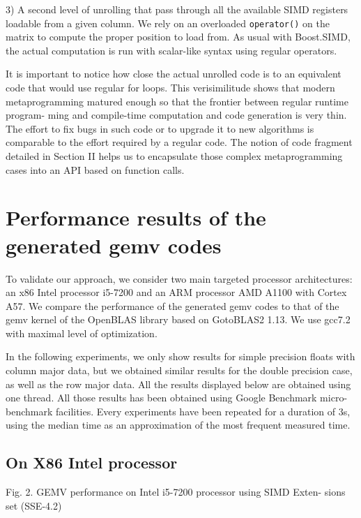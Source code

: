 \documentclass[../main]{subfiles}
\begin{document}
3) A second level of unrolling that pass through all the
available SIMD registers loadable from a given column.
We rely on an overloaded \lstinline{operator()} on the matrix
to compute the proper position to load from. As usual
with Boost.SIMD, the actual computation is run with
scalar-like syntax using regular operators.

It is important to notice how close the actual unrolled code
is to an equivalent code that would use regular for loops. This
verisimilitude shows that modern metaprogramming matured
enough so that the frontier between regular runtime program-
ming and compile-time computation and code generation is
very thin. The effort to fix bugs in such code or to upgrade
it to new algorithms is comparable to the effort required
by a regular code. The notion of code fragment detailed
in Section II helps us to encapsulate those complex metaprogramming
cases into an API based on function calls.

\section{
  Performance results of the generated gemv codes
}

To validate our approach, we consider two main targeted
processor architectures: an x86 Intel processor i5-7200 and an
ARM processor AMD A1100 with Cortex A57. We compare
the performance of the generated gemv codes to that of the
gemv kernel of the OpenBLAS library based on GotoBLAS2
1.13\cite{hpcs21}. We use gcc7.2\cite{hpcs22} with maximal
level of optimization.

In the following experiments, we only show results
for simple precision floats with column major data, but we
obtained similar results for the double precision case, as well
as the row major data. All the results displayed below are
obtained using one thread. All those results has been obtained
using Google Benchmark micro-benchmark facilities. Every
experiments have been repeated for a duration of 3s, using
the median time as an approximation of the most frequent
measured time.

\subsection{
  On X86 Intel processor
}


Fig. 2. GEMV performance on Intel i5-7200 processor using SIMD Exten-
sions set (SSE-4.2)
\end{document}
